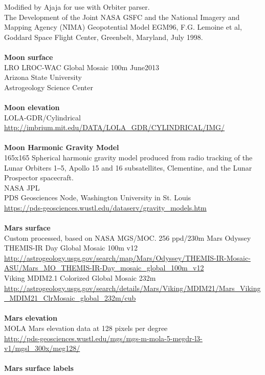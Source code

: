 \documentclass[Orbiter User Manual.tex]{subfiles}
\begin{document}
Modified by Ajaja for use with Orbiter parser.\\
The Development of the Joint NASA GSFC and the National Imagery and Mapping Agency (NIMA) Geopotential Model EGM96, F.G. Lemoine et al, Goddard Space Flight Center, Greenbelt, Maryland, July 1998.\\
\\
\textbf{Moon surface}\\
LRO LROC-WAC Global Mosaic 100m June2013\\
Arizona State University\\
Astrogeology Science Center\\
\\
\textbf{Moon elevation}\\
LOLA-GDR/Cylindrical\\
\url{http://imbrium.mit.edu/DATA/LOLA_GDR/CYLINDRICAL/IMG/}\\
\\
\textbf{Moon Harmonic Gravity Model}\\
165x165 Spherical harmonic gravity model produced from radio tracking of the Lunar Orbiters 1‒5, Apollo 15 and 16 subsatellites, Clementine, and the Lunar Prospector spacecraft.\\
NASA JPL\\
PDS Geosciences Node, Washington University in St. Louis\\
\url{https://pds-geosciences.wustl.edu/dataserv/gravity_models.htm}\\
\\
\textbf{Mars surface}\\
Custom processed, based on NASA MGS/MOC. 256 ppd/230m Mars Odyssey THEMIS-IR Day Global Mosaic 100m v12\\
\url{http://astrogeology.usgs.gov/search/map/Mars/Odyssey/THEMIS-IR-Mosaic-ASU/Mars_MO_THEMIS-IR-Day_mosaic_global_100m_v12}\\
Viking MDIM2.1 Colorized Global Mosaic 232m\\
\url{http://astrogeology.usgs.gov/search/details/Mars/Viking/MDIM21/Mars_Viking_MDIM21_ClrMosaic_global_232m/cub}\\
\\
\textbf{Mars elevation}\\
MOLA Mars elevation data at 128 pixels per degree\\
\url{http://pds-geosciences.wustl.edu/mgs/mgs-m-mola-5-megdr-l3-v1/mgsl_300x/meg128/}\\
\\
\textbf{Mars surface labels}\\
\end{document}
